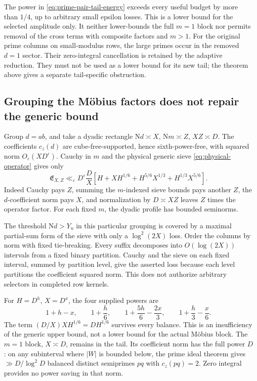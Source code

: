 \documentclass[11pt]{article}
\numberwithin{equation}{section}
\theoremstyle{definition}
\theoremstyle{remark}
\newcommand{\N}{\mathrm N}
\newcommand{\eps}{\varepsilon}
\begin{document}
The power in \eqref{eq:prime-pair-tail-energy} exceeds every useful
budget by more than \(1/4\), up to arbitrary small epsilon losses.
This is a lower bound for the selected amplitude only.
It neither lower-bounds the full \(m=1\) block nor permits removal
of the cross terms with composite factors and \(m>1\).
For the original prime columns on small-modulus rows, the large
primes occur in the removed \(d=1\) sector. Their zero-integral
cancellation is retained by the adaptive reduction. They must not
be used as a lower bound for its new tail; the theorem above gives
a separate tail-specific obstruction.

\subsection{Grouping the Möbius factors does not repair the generic bound}

Group \(d=ab\), and take a dyadic rectangle
\(\N d\asymp X\), \(\N m\asymp Z\), \(XZ\asymp D\).
The coefficients \(c_z(d)\) are cube-free-supported, hence
sixth-power-free, with squared norm \(O_\eps(XD^\eps)\).
Cauchy in \(m\) and the physical generic sieve
\eqref{eq:physical-operator} gives only
\begin{equation}\label{eq:generic-bilinear}
 \mathfrak E_{X,Z}\ll_\eps D^\eps\frac D X
 \left[H+XH^{1/6}+H^{5/6}X^{1/3}+H^{1/3}X^{5/6}\right].
\end{equation}
Indeed Cauchy pays \(Z\), summing the \(m\)-indexed sieve bounds
pays another \(Z\), the \(d\)-coefficient norm pays \(X\), and
normalization by \(D\asymp XZ\) leaves \(Z\) times the operator factor.
For each fixed \(m\), the dyadic profile has bounded seminorms.

The threshold \(\N d>Y_u\) in this particular grouping is covered
by a maximal partial-sum form of the sieve with only a
\(\log^2(2X)\) loss. Order the columns by norm with fixed tie-breaking.
Every suffix decomposes into \(O(\log(2X))\) intervals from a fixed
binary partition. Cauchy and the sieve on each fixed interval,
summed by partition level, give the asserted loss because each level
partitions the coefficient squared norm.
This does not authorize arbitrary selectors in completed row kernels.

For \(H=D^h\), \(X=D^x\), the four supplied powers are
\[
 1+h-x,\qquad 1+\frac h6,\qquad
 1+\frac{5h}{6}-\frac{2x}{3},\qquad
 1+\frac h3-\frac x6.
\]
The term \((D/X)XH^{1/6}=DH^{1/6}\) survives every balance.
This is an insufficiency of the generic upper bound, not a lower
bound for the actual M\"obius block.
The \(m=1\) block, \(X\asymp D\), remains in the tail.
Its coefficient norm has the full power \(D\): on any subinterval
where \(|W|\) is bounded below, the prime ideal theorem gives
\(\gg D/\log^2D\) balanced distinct semiprimes \(pq\) with
\(c_z(pq)=2\).
Zero integral provides no power saving in that norm.
\end{document}
